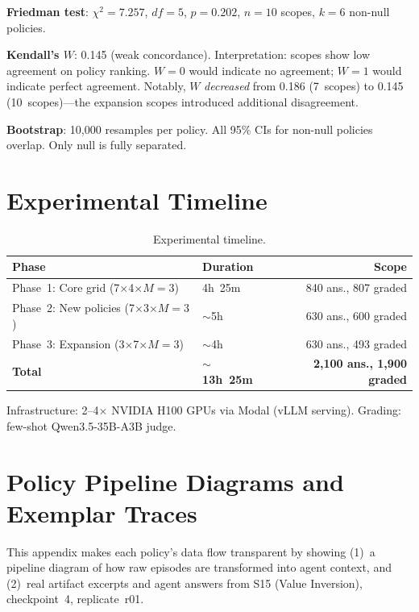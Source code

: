 \documentclass[11pt,a4paper]{article}
\begin{document}
\textbf{Friedman test}: $\chi^2 = 7.257$, $df = 5$, $p = 0.202$, $n = 10$ scopes, $k = 6$ non-null policies.

\textbf{Kendall's $W$}: 0.145 (weak concordance). Interpretation: scopes show low agreement on policy ranking. $W = 0$ would indicate no agreement; $W = 1$ would indicate perfect agreement. Notably, $W$ \emph{decreased} from 0.186 (7~scopes) to 0.145 (10~scopes)---the expansion scopes introduced additional disagreement.

\textbf{Bootstrap}: 10,000 resamples per policy. All 95\% CIs for non-null policies overlap. Only null is fully separated.

\section{Experimental Timeline}

\begin{table}[H]
\centering
\caption{Experimental timeline.}
\label{tab:timeline}
\small
\begin{tabularx}{\textwidth}{@{}Xlr@{}}
\toprule
\textbf{Phase} & \textbf{Duration} & \textbf{Scope} \\
\midrule
Phase~1: Core grid (7$\times$4$\times$$M{=}3$) & 4h~25m & 840 ans., 807 graded \\
Phase~2: New policies (7$\times$3$\times$$M{=}3$) & ${\sim}$5h & 630 ans., 600 graded \\
Phase~3: Expansion (3$\times$7$\times$$M{=}3$) & ${\sim}$4h & 630 ans., 493 graded \\
\midrule
\textbf{Total} & \textbf{${\sim}$13h~25m} & \textbf{2,100 ans., 1,900 graded} \\
\bottomrule
\end{tabularx}
\end{table}

Infrastructure: 2--4$\times$ NVIDIA H100 GPUs via Modal (vLLM serving). Grading: few-shot Qwen3.5-35B-A3B judge.

\section{Policy Pipeline Diagrams and Exemplar Traces}
\label{app:traces}

This appendix makes each policy's data flow transparent by showing (1)~a pipeline diagram of how raw episodes are transformed into agent context, and (2)~real artifact excerpts and agent answers from S15 (Value Inversion), checkpoint~4, replicate~r01.
\end{document}
